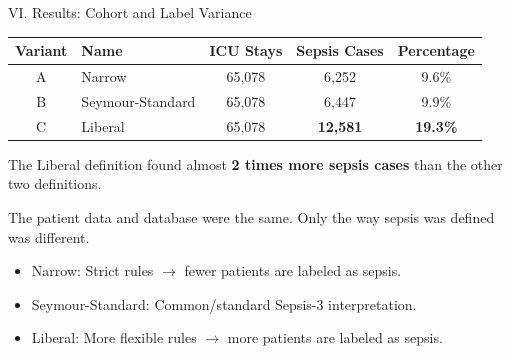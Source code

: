 \begin{frame}{VI. Results: Cohort and Label Variance}
\begin{center}\tablestyle
\begin{tabular}{clccc}
\toprule
\textbf{Variant} & \textbf{Name} & \textbf{ICU Stays}
  & \textbf{Sepsis Cases} & \textbf{Percentage} \\
\midrule
A & Narrow           & 65,078 & 6,252           & 9.6\% \\
B & Seymour-Standard & 65,078 & 6,447           & 9.9\% \\
C & Liberal          & 65,078 & \textbf{12,581} & \textbf{19.3\%} \\
\bottomrule
\end{tabular}
\end{center}

\vspace{4pt}
{\small The Liberal definition found almost \textbf{2 times more sepsis
cases} than the other two definitions.\par}

\vspace{2pt}
{\small The patient data and database were the same. Only the way sepsis was
defined was different.\par}

\vspace{4pt}
\begin{block}{}
  \begin{itemize}\itemsep0pt\small
    \item Narrow: Strict rules $\rightarrow$ fewer patients are labeled as
          sepsis.
    \item Seymour-Standard: Common/standard Sepsis-3 interpretation.
    \item Liberal: More flexible rules $\rightarrow$ more patients are
          labeled as sepsis.
  \end{itemize}
\end{block}
\end{frame}


